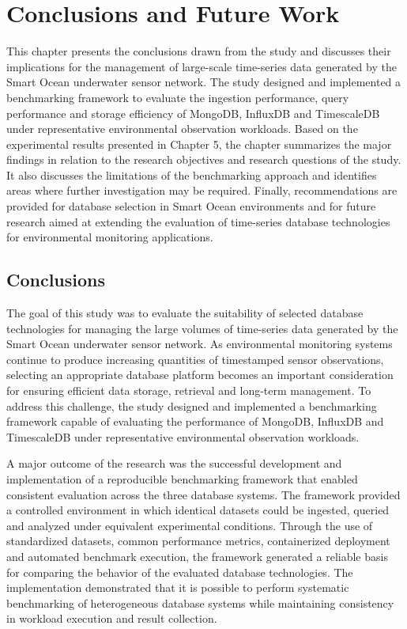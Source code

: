 \chapter{Conclusions and Future Work}
\label{chap:conclusion}



This chapter presents the conclusions drawn from the study and discusses their implications for the management of large-scale time-series data generated by the Smart Ocean underwater sensor network. The study designed and implemented a benchmarking framework to evaluate the ingestion performance, query performance and storage efficiency of MongoDB, InfluxDB and TimescaleDB under representative environmental observation workloads. Based on the experimental results presented in Chapter 5, the chapter summarizes the major findings in relation to the research objectives and research questions of the study. It also discusses the limitations of the benchmarking approach and identifies areas where further investigation may be required. Finally, recommendations are provided for database selection in Smart Ocean environments and for future research aimed at extending the evaluation of time-series database technologies for environmental monitoring applications.


\section{Conclusions}
The goal of this study was to evaluate the suitability of selected database technologies for managing the large volumes of time-series data generated by the Smart Ocean underwater sensor network. As environmental monitoring systems continue to produce increasing quantities of timestamped sensor observations, selecting an appropriate database platform becomes an important consideration for ensuring efficient data storage, retrieval and long-term management. To address this challenge, the study designed and implemented a benchmarking framework capable of evaluating the performance of MongoDB, InfluxDB and TimescaleDB under representative environmental observation workloads.

A major outcome of the research was the successful development and implementation of a reproducible benchmarking framework that enabled consistent evaluation across the three database systems. The framework provided a controlled environment in which identical datasets could be ingested, queried and analyzed under equivalent experimental conditions. Through the use of standardized datasets, common performance metrics, containerized deployment and automated benchmark execution, the framework generated a reliable basis for comparing the behavior of the evaluated database technologies. The implementation demonstrated that it is possible to perform systematic benchmarking of heterogeneous database systems while maintaining consistency in workload execution and result collection.

